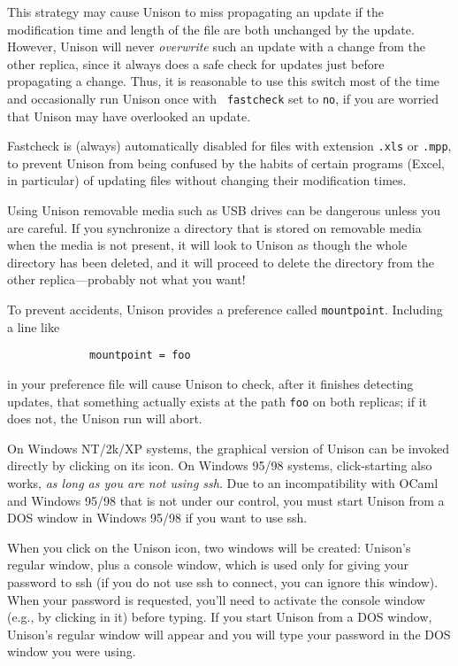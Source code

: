 \documentclass{article}
\begin{document}
This strategy may cause Unison to miss propagating an update if the
 modification time and length of the file are both unchanged
by the update.
However, Unison will never {\em overwrite} such an update with a change
from the other replica, since it always does a safe check for updates
just before propagating a change.  Thus, it is reasonable to use this
switch most of the time and occasionally run Unison once with {\tt
  fastcheck} set to \verb|no|, if you are worried that Unison may have
overlooked an update.

Fastcheck is (always) automatically disabled for files with extension
\verb|.xls| or \verb|.mpp|, to prevent Unison from being confused by the
habits of certain programs (Excel, in particular) of updating files without
changing their modification times.


Using Unison removable media such as USB drives can be dangerous unless you
are careful.  If you synchronize a directory that is stored on removable
media when the media is not present, it will look to Unison as though the
whole directory has been deleted, and it will proceed to delete the
directory from the other replica---probably not what you want!

To prevent accidents, Unison provides a preference called
\verb|mountpoint|.  Including a line like
\begin{verbatim}
             mountpoint = foo
\end{verbatim}
in your preference file will cause Unison to check, after it finishes
detecting updates, that something actually exists at the path
\verb|foo| on both replicas; if it does not, the Unison run will
abort.


On Windows NT/2k/XP systems, the graphical version of Unison can be
invoked directly by clicking on its icon.  On Windows 95/98 systems,
click-starting also works, {\em as long as you are not using ssh}.
Due to an incompatibility with OCaml and Windows 95/98 that is not
under our control, you must start Unison from a DOS window in Windows
95/98 if you want to use ssh.

When you click on the Unison icon, two windows will be created:
Unison's regular window, plus a console window, which is used only for
giving your password to ssh (if you do not use ssh to connect, you can
ignore this window).  When your password is requested, you'll need to
activate the console window (e.g., by clicking in it) before typing.
If you start Unison from a DOS window, Unison's regular window will
appear and you will type your password in the DOS window you were
using.
\end{document}
